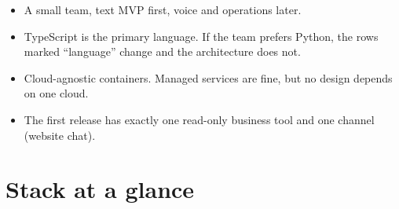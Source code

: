 \begin{itemize}
\item A small team, text MVP first, voice and operations later.
\item TypeScript is the primary language. If the team prefers Python, the rows marked ``language'' change and the architecture does not.
\item Cloud-agnostic containers. Managed services are fine, but no design depends on one cloud.
\item The first release has exactly one read-only business tool and one channel (website chat).
\end{itemize}
\section{Stack at a glance}

